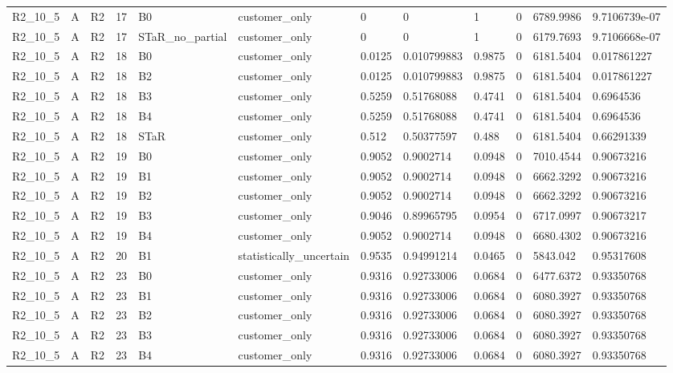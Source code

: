 \begin{longtable}{llllllllllll}
R2\_10\_5 & A & R2 & 17 & B0 & customer\_only & 0 & 0 & 1 & 0 & 6789.9986 & 9.7106739e-07 \\
R2\_10\_5 & A & R2 & 17 & STaR\_no\_partial & customer\_only & 0 & 0 & 1 & 0 & 6179.7693 & 9.7106668e-07 \\
R2\_10\_5 & A & R2 & 18 & B0 & customer\_only & 0.0125 & 0.010799883 & 0.9875 & 0 & 6181.5404 & 0.017861227 \\
R2\_10\_5 & A & R2 & 18 & B2 & customer\_only & 0.0125 & 0.010799883 & 0.9875 & 0 & 6181.5404 & 0.017861227 \\
R2\_10\_5 & A & R2 & 18 & B3 & customer\_only & 0.5259 & 0.51768088 & 0.4741 & 0 & 6181.5404 & 0.6964536 \\
R2\_10\_5 & A & R2 & 18 & B4 & customer\_only & 0.5259 & 0.51768088 & 0.4741 & 0 & 6181.5404 & 0.6964536 \\
R2\_10\_5 & A & R2 & 18 & STaR & customer\_only & 0.512 & 0.50377597 & 0.488 & 0 & 6181.5404 & 0.66291339 \\
R2\_10\_5 & A & R2 & 19 & B0 & customer\_only & 0.9052 & 0.9002714 & 0.0948 & 0 & 7010.4544 & 0.90673216 \\
R2\_10\_5 & A & R2 & 19 & B1 & customer\_only & 0.9052 & 0.9002714 & 0.0948 & 0 & 6662.3292 & 0.90673216 \\
R2\_10\_5 & A & R2 & 19 & B2 & customer\_only & 0.9052 & 0.9002714 & 0.0948 & 0 & 6662.3292 & 0.90673216 \\
R2\_10\_5 & A & R2 & 19 & B3 & customer\_only & 0.9046 & 0.89965795 & 0.0954 & 0 & 6717.0997 & 0.90673217 \\
R2\_10\_5 & A & R2 & 19 & B4 & customer\_only & 0.9052 & 0.9002714 & 0.0948 & 0 & 6680.4302 & 0.90673216 \\
R2\_10\_5 & A & R2 & 20 & B1 & statistically\_uncertain & 0.9535 & 0.94991214 & 0.0465 & 0 & 5843.042 & 0.95317608 \\
R2\_10\_5 & A & R2 & 23 & B0 & customer\_only & 0.9316 & 0.92733006 & 0.0684 & 0 & 6477.6372 & 0.93350768 \\
R2\_10\_5 & A & R2 & 23 & B1 & customer\_only & 0.9316 & 0.92733006 & 0.0684 & 0 & 6080.3927 & 0.93350768 \\
R2\_10\_5 & A & R2 & 23 & B2 & customer\_only & 0.9316 & 0.92733006 & 0.0684 & 0 & 6080.3927 & 0.93350768 \\
R2\_10\_5 & A & R2 & 23 & B3 & customer\_only & 0.9316 & 0.92733006 & 0.0684 & 0 & 6080.3927 & 0.93350768 \\
R2\_10\_5 & A & R2 & 23 & B4 & customer\_only & 0.9316 & 0.92733006 & 0.0684 & 0 & 6080.3927 & 0.93350768 \\

\end{longtable}
